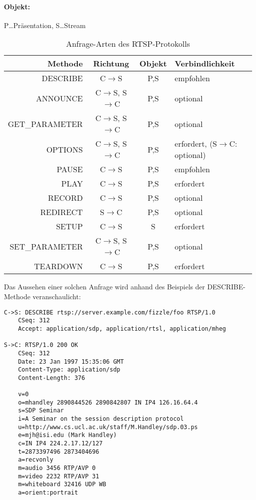 \paragraph{Objekt:}P\dots Präsentation, S\dots Stream
\begin{table}
    \centering\begin{tabular}{|r|c|c|l|}
        \hline%
        Methode         &Richtung                           &Objekt &Verbindlichkeit\\
        \hline%
        DESCRIBE        &C$\rightarrow$S                    &P,S    &empfohlen\\
        ANNOUNCE        &C$\rightarrow$S, S$\rightarrow$C   &P,S    &optional\\
        GET\_PARAMETER  &C$\rightarrow$S, S$\rightarrow$C   &P,S    &optional\\
        OPTIONS         &C$\rightarrow$S, S$\rightarrow$C   &P,S    &erfordert, (S$\rightarrow$C: optional)\\
        PAUSE           &C$\rightarrow$S                    &P,S    &empfohlen\\
        PLAY            &C$\rightarrow$S                    &P,S    &erfordert\\
        RECORD          &C$\rightarrow$S                    &P,S    &optional\\
        REDIRECT        &S$\rightarrow$C                    &P,S    &optional\\
        SETUP           &C$\rightarrow$S                    &S      &erfordert\\
        SET\_PARAMETER  &C$\rightarrow$S, S$\rightarrow$C   &P,S    &optional\\
        TEARDOWN        &C$\rightarrow$S                    &P,S    &erfordert\\
        \hline%
    \end{tabular}
    \caption{Anfrage-Arten des RTSP-Protokolls}
    \label{tab:rtsp-req}
\end{table}
Das Aussehen einer solchen Anfrage wird anhand des Beispiels der DESCRIBE-Methode veranschaulicht:
\begin{lstlisting}
C->S: DESCRIBE rtsp://server.example.com/fizzle/foo RTSP/1.0
    CSeq: 312
    Accept: application/sdp, application/rtsl, application/mheg

S->C: RTSP/1.0 200 OK
    CSeq: 312
    Date: 23 Jan 1997 15:35:06 GMT
    Content-Type: application/sdp
    Content-Length: 376

    v=0
    o=mhandley 2890844526 2890842807 IN IP4 126.16.64.4
    s=SDP Seminar
    i=A Seminar on the session description protocol
    u=http://www.cs.ucl.ac.uk/staff/M.Handley/sdp.03.ps
    e=mjh@isi.edu (Mark Handley)
    c=IN IP4 224.2.17.12/127
    t=2873397496 2873404696
    a=recvonly
    m=audio 3456 RTP/AVP 0
    m=video 2232 RTP/AVP 31
    m=whiteboard 32416 UDP WB
    a=orient:portrait
\end{lstlisting}
